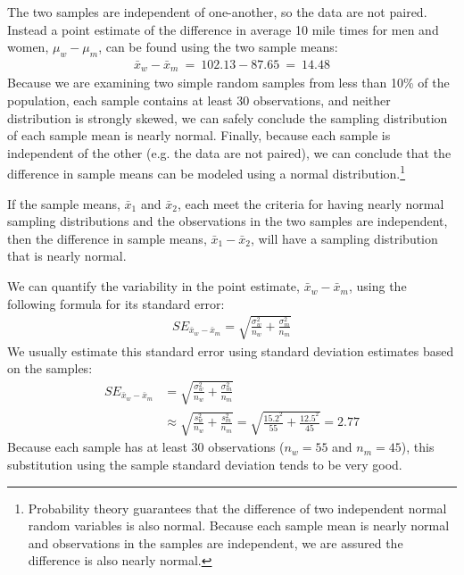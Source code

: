 The two samples are independent of one-another, so the data are not paired. Instead a point estimate of the difference in average 10 mile times for men and women, $\mu_w - \mu_m$, can be found using the two sample means:
\begin{eqnarray*}
\bar{x}_{w} - \bar{x}_{m}\ =\ 102.13 - 87.65\ =\ 14.48
\end{eqnarray*}
Because we are examining two simple random samples from less than 10\% of the population, each sample contains at least 30 observations, and neither distribution is strongly skewed, we can safely conclude the sampling distribution of each sample mean is nearly normal. Finally, because each sample is independent of the other (e.g. the data are not paired), we can conclude that the difference in sample means can be modeled using a normal distribution.\footnote{Probability theory guarantees that the difference of two independent normal random variables is also normal. Because each sample mean is nearly normal and observations in the samples are independent, we are assured the difference is also nearly normal.}

\begin{termBox}{
If the sample means, $\bar{x}_1$ and $\bar{x}_2$, each meet the criteria for having nearly normal sampling distributions and the observations in the two samples are independent, then the difference in sample means, $\bar{x}_1 - \bar{x}_2$, will have a sampling distribution that is nearly normal.}
\end{termBox}

We can quantify the variability in the point estimate, $\bar{x}_{w} - \bar{x}_{m}$, using the following formula for its standard error:
\begin{eqnarray*}
SE_{\bar{x}_{w} - \bar{x}_{m}} = \sqrt{\frac{\sigma_{w}^2}{n_{w}} + \frac{\sigma_{m}^2}{n_{m}}}
\end{eqnarray*}
We usually estimate this standard error using standard deviation estimates  based on the samples:
\begin{align*}
SE_{\bar{x}_{w} - \bar{x}_{m}}
	&= \sqrt{\frac{\sigma_{w}^2}{n_{w}} + \frac{\sigma_{m}^2}{n_{m}}} \\
	&\approx \sqrt{\frac{s_{w}^2}{n_{w}} + \frac{s_{m}^2}{n_{m}}}
	= \sqrt{\frac{15.2^2}{55} + \frac{12.5^2}{45}} = 2.77
\end{align*}
Because each sample has at least 30 observations ($n_{w} = 55$ and $n_{m} = 45$), this substitution using the sample standard deviation tends to be very good.

